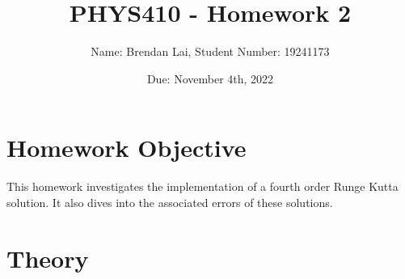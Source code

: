 \documentclass{article}
\title{PHYS410 - Homework 2}
\author{Name: Brendan Lai, Student Number: 19241173}
\date{Due: November 4th, 2022}
\begin{document}
  
\maketitle
  
\tableofcontents

\section{Homework Objective}
This homework investigates the implementation of a fourth order Runge Kutta solution. It also dives into the associated errors of these solutions.

\section{Theory}
\end{document}

